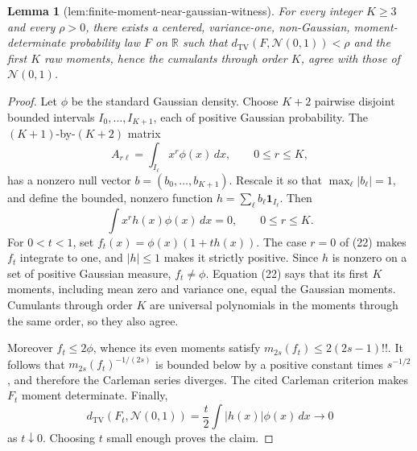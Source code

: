 \documentclass{article}
\newtheorem{lemma}{Lemma}
\begin{document}
\begin{lemma}[lem:finite-moment-near-gaussian-witness]\label{lem:finite-moment-near-gaussian-witness}
For every integer \(K\ge3\) and every \(\rho>0\), there exists a centered, variance-one, non-Gaussian, moment-determinate probability law \(F\) on \(\mathbb R\) such that \(d_{\mathrm{TV}}(F,\mathcal N(0,1))<\rho\) and the first \(K\) raw moments, hence the cumulants through order \(K\), agree with those of \(\mathcal N(0,1)\).
\end{lemma}
\begin{proof}
Let \(\phi\) be the standard Gaussian density. Choose \(K+2\) pairwise disjoint bounded intervals \(I_0,\ldots,I_{K+1}\), each of positive Gaussian probability. The \((K+1)\)-by-\((K+2)\) matrix
\[
 A_{r\ell}=\int_{I_\ell}x^r\phi(x)\,dx,
 \qquad 0\le r\le K,
\]
has a nonzero null vector \(b=(b_0,\ldots,b_{K+1})\). Rescale it so that \(\max_\ell|b_\ell|=1\), and define the bounded, nonzero function \(h=\sum_\ell b_\ell\mathbf 1_{I_\ell}\). Then
\[
 \int x^rh(x)\phi(x)\,dx=0,
 \qquad 0\le r\le K. \tag{22}
\]
For \(0<t<1\), set \(f_t(x)=\phi(x)(1+th(x))\). The case \(r=0\) of (22) makes \(f_t\) integrate to one, and \(|h|\le1\) makes it strictly positive. Since \(h\) is nonzero on a set of positive Gaussian measure, \(f_t\ne\phi\). Equation (22) says that its first \(K\) moments, including mean zero and variance one, equal the Gaussian moments. Cumulants through order \(K\) are universal polynomials in the moments through the same order, so they also agree.

Moreover \(f_t\le2\phi\), whence its even moments satisfy \(m_{2s}(f_t)\le2(2s-1)!!\). It follows that \(m_{2s}(f_t)^{-1/(2s)}\) is bounded below by a positive constant times \(s^{-1/2}\), and therefore the Carleman series diverges. The cited Carleman criterion makes \(F_t\) moment determinate. Finally,
\[
 d_{\mathrm{TV}}(F_t,\mathcal N(0,1))
 =\frac t2\int|h(x)|\phi(x)\,dx\longrightarrow0
\]
as \(t\downarrow0\). Choosing \(t\) small enough proves the claim.
\end{proof}
\end{document}
